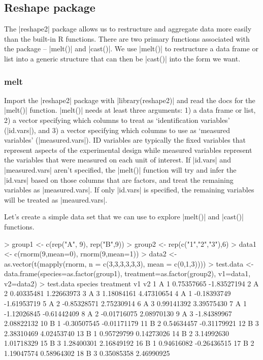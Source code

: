 \subsection{Reshape package}

The |reshape2| package allows us to restructure and aggregate data more easily than the built-in R functions.  There are two primary functions associated with the package -- |melt()| and |cast()|.  We use |melt()| to restructure a data frame or list into a generic structure that can then be |cast()| into the form we want.


\subsubsection{melt}

Import the |reshape2| package with |library(reshape2)| and read the docs for the |melt()| function.  |melt()| needs at least three arguments: 1) a data frame or list, 2) a vector specifying which columns to treat as `identification variables' (|id.vars|), and 3) a vector specifying which columns to use as `measured variables' (|measured.vars|).  ID variables are typically the fixed variables that represent aspects of the experimental design while measured variables represent the variables that were measured on each unit of interest.  If |id.vars| and |measured.vars| aren't specified, the |melt()| function will try and infer the |id.vars| based on those columns that are factors, and treat the remaining variables as |measured.vars|.  If only |id.vars| is specified, the remaining variables will be treated as |meaured.vars|.

Let's create a simple data set that we can use to explore |melt()| and |cast()| functions.
%
\begin{R}
> group1 <- c(rep("A", 9), rep("B",9))
> group2 <- rep(c("1","2","3"),6)
> data1 <- c(rnorm(9,mean=0), rnorm(9,mean=1))
> data2 <- as.vector(t(mapply(rnorm, n = c(3,3,3,3,3,3), mean = c(0,1,3))))
> test.data <- data.frame(species=as.factor(group1), 
                          treatment=as.factor(group2), 
                          v1=data1, v2=data2)
> test.data
   species treatment          v1          v2
1        A         1  0.75357665 -1.83527194
2        A         2  0.40335481  1.22663973
3        A         3  1.18084161  4.47310654
4        A         1 -0.18393749 -1.61953719
5        A         2 -0.85328571  2.75230914
6        A         3  0.99141392  3.39575430
7        A         1 -1.12026845 -0.61442409
8        A         2 -0.01716075  2.08970130
9        A         3 -1.84389967  2.08822132
10       B         1 -0.30507545 -0.01171179
11       B         2  0.54634457 -0.31179921
12       B         3  2.38310469  4.02453740
13       B         1  0.95729799  0.14273026
14       B         2  3.14992630  1.01718329
15       B         3  1.28400301  2.16849192
16       B         1  0.94616082 -0.26436515
17       B         2  1.19047574  0.58964302
18       B         3  0.35085358  2.46990925
\end{R}
%

